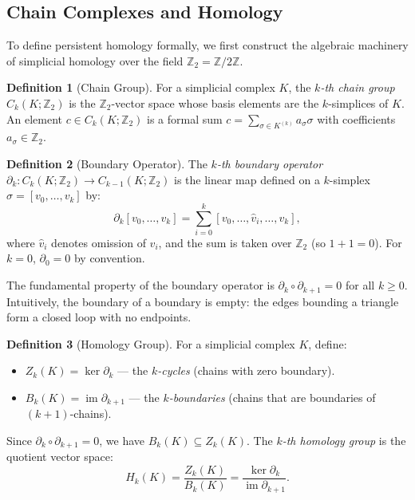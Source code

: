 \documentclass[12pt, a4paper]{report}
\newcommand{\Z}{\mathbb{Z}}
\DeclareMathOperator{\im}{im}
\theoremstyle{definition}
\newtheorem{definition}{Definition}[chapter]
\theoremstyle{plain}
\theoremstyle{remark}
\begin{document}
\subsection*{Chain Complexes and Homology}

To define persistent homology formally, we first construct the
algebraic machinery of simplicial homology over the field
$\Z_2 = \Z / 2\Z$.

\begin{definition}[Chain Group]
  For a simplicial complex $K$, the \emph{$k$-th chain group}
  $C_k(K; \Z_2)$ is the $\Z_2$-vector space whose basis elements
  are the $k$-simplices of $K$. An element $c \in C_k(K; \Z_2)$ is
  a formal sum $c = \sum_{\sigma \in K^{(k)}} a_\sigma \sigma$ with
  coefficients $a_\sigma \in \Z_2$.
\end{definition}

\begin{definition}[Boundary Operator]
  The \emph{$k$-th boundary operator} $\partial_k: C_k(K; \Z_2)
  \to C_{k-1}(K; \Z_2)$ is the linear map defined on a $k$-simplex
  $\sigma = [v_0, \dots, v_k]$ by:
  \begin{equation}
    \partial_k [v_0, \dots, v_k] = \sum_{i=0}^{k}
    [v_0, \dots, \hat{v}_i, \dots, v_k],
    \label{eq:boundary}
  \end{equation}
  where $\hat{v}_i$ denotes omission of $v_i$, and the sum is taken
  over $\Z_2$ (so $1 + 1 = 0$). For $k = 0$, $\partial_0 = 0$ by
  convention.
\end{definition}

The fundamental property of the boundary operator is $\partial_k
\circ \partial_{k+1} = 0$ for all $k \ge 0$. Intuitively, the
boundary of a boundary is empty: the edges bounding a triangle
form a closed loop with no endpoints.

\begin{definition}[Homology Group]
  For a simplicial complex $K$, define:
  \begin{itemize}
    \item $Z_k(K) = \ker \partial_k$ --- the \emph{$k$-cycles}
      (chains with zero boundary).
    \item $B_k(K) = \im \partial_{k+1}$ --- the \emph{$k$-boundaries}
      (chains that are boundaries of $(k+1)$-chains).
  \end{itemize}
  Since $\partial_k \circ \partial_{k+1} = 0$, we have $B_k(K)
  \subseteq Z_k(K)$. The \emph{$k$-th homology group} is the
  quotient vector space:
  \begin{equation}
    H_k(K) = \frac{Z_k(K)}{B_k(K)}
    = \frac{\ker \partial_k}{\im \partial_{k+1}}.
    \label{eq:homology}
  \end{equation}
\end{definition}
\end{document}
